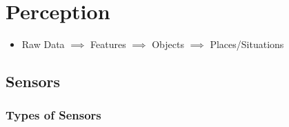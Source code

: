 
\section{Perception}
\begin{itemize}
    \item Raw Data $\implies$ Features $\implies$ Objects $\implies$ Places/Situations
\end{itemize}

\subsection{Sensors}
\subsubsection{Types of Sensors}
